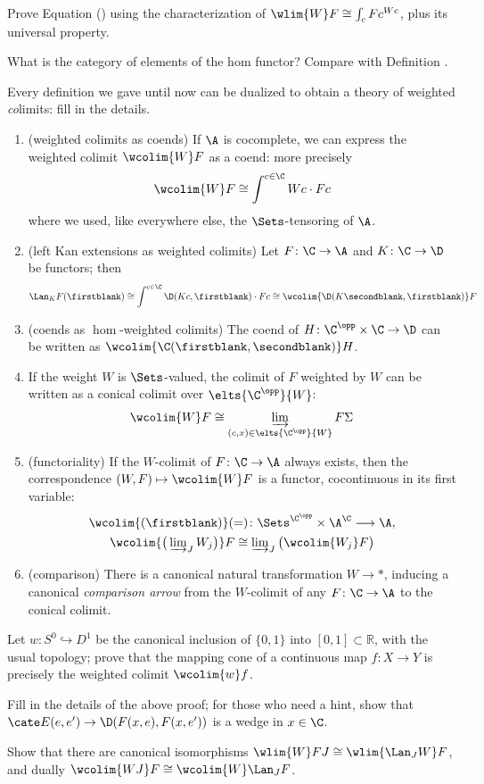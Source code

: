 \begin{exerciseset}
\begin{exercisepoints}
\item Prove Equation () using the characterization of $\wlim{W}F\cong \int_c Fc^{Wc}$, plus its universal property.
\item What is the category of elements of the hom functor? Compare with Definition .
\item \label{ex4:wcolims} Every definition we gave until now can be dualized to obtain a theory of weighted \emph{co}limits: fill in the details.
\begin{enumerate}[label=$\roman*$)]
	\item (weighted colimits as coends) If $\A$ is cocomplete, we can express the weighted colimit $\wcolim{W}F$ as a coend: more precisely
	\[
	\wcolim{W}F\cong \int^{c\in\C} Wc\cdot Fc
	\] 
	where we used, like everywhere else, the $\Sets$-tensoring of $\A$.
	\item (left Kan extensions as weighted colimits) Let $F\colon \C\to \A$ and $K\colon \C\to \D$ be functors; then 
	\[
	\Lan_KF(\firstblank)\cong \int^{c\in\C} \D(Kc,\firstblank)\cdot Fc\cong \wcolim{\D(K\secondblank,\firstblank)}F
	\]
	\item (coends as $\hom$-weighted colimits) The coend of $H\colon \C^\opp\times\C\to \D$ can be written as  $\wcolim{\C(\firstblank,\secondblank)}H$.
	\item If the weight $W$ is $\Sets$-valued, the colimit of $F$ weighted by $W$ can be written as a conical colimit over $\elts{\C^\opp}{W}$: 
	\[
	 \wcolim{W}F\cong \varinjlim_{(c,x)\in \elts{\C^\opp}{W}}F\Sigma
	\]
	\item (functoriality) If the $W$-colimit of $F\colon\C\to\A$ always exists, then the correspondence $(W,F)\mapsto \wcolim{W}F$ is a functor, cocontinuous in its first variable:
	\begin{gather}
	\wcolim{(\firstblank)}(=)\colon \Sets^{\C^\opp} \times \A^\C\longrightarrow \A, \notag \\
	\textstyle 
	\wcolim{\big(\varinjlim_J W_j\big)}F\cong \varinjlim_J \big(\wcolim{W_j}F\big)
	\end{gather}
	\item (comparison) There is a canonical natural transformation $W\to *$, inducing a canonical \emph{comparison arrow} from the $W$-colimit of any $F\colon \C\to \A$ to the conical colimit.
\end{enumerate}
\item \label{ex:cone-again} Let $w\colon S^0 \hookrightarrow D^1$ be the canonical inclusion of $\{0,1\}$ into $[0,1]\subset \mathbb{R}$, with the usual topology; prove that the mapping cone of a continuous map $f\colon X\to Y$ is precisely the weighted colimit $\wcolim{w}f$.
\item Fill in the details of the above proof; for those who need a hint, show that $\cate E(e, e')\to \D(F(x,e), F(x, e'))$ is a wedge in $x\in \C$.
\item Show that there are canonical isomorphisms $\wlim{W}FJ\cong \wlim{\Lan_JW}F$, and dually $\wcolim{WJ}F\cong \wcolim{W}\Lan_JF$.
\end{exercisepoints}
\end{exerciseset}
